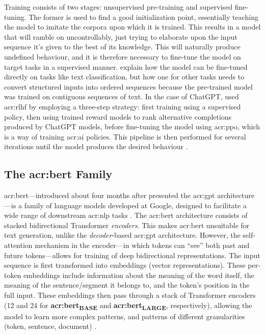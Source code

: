 Training consists of two stages: unsupervised pre-training and supervised fine-tuning. The former is used to find a good initialization point, essentially teaching the model to imitate the corpora upon which it is trained. This results in a model that will ramble on uncontrollably, just trying to elaborate upon the input sequence it's given to the best of its knowledge. This will naturally produce undefined behaviour, and it is therefore necessary to fine-tune the model on target tasks in a supervised manner. \cite[4]{radfordImprovingLanguageUnderstanding2018} explain how the model can be fine-tuned directly on tasks like text classification, but how one for other tasks needs to convert structured inputs into ordered sequences because the pre-trained model was trained on contiguous sequences of text. In the case of ChatGPT, \citeauthor{openaiIntroducingChatGPT2022} used \gls{acr:rlhf} by employing a three-step strategy: first training using a supervised policy, then using trained reward models to rank alternative completions produced by ChatGPT models, before fine-tuning the model using \gls{acr:ppo}, which is a way of training \acrshort{acr:ai} policies. This pipeline is then performed for several iterations until the model produces the desired behaviour \citep{openaiIntroducingChatGPT2022}.

\subsection[The BERT Family]{The \acrshort{acr:bert} Family}\label{subsec:bert}

\gls{acr:bert}---introduced about four months after \cite{radfordImprovingLanguageUnderstanding2018} presented the \acrshort{acr:gpt} architecture---is a family of language models developed at Google, designed to facilitate a wide range of downstream \gls{acr:nlp} tasks \citep[5]{devlinBERTPretrainingDeep2019}. The \acrshort{acr:bert} architecture consists of stacked bidirectional Transformer \textit{encoders}. This makes \acrshort{acr:bert} unsuitable for text generation, unlike the \textit{decoder}-based \acrshort{acr:gpt} architecture. However, the self-attention mechanism in the encoder---in which tokens can \enquote{see} both past and future tokens---allows for training of deep bidirectional representations. The input sequence is first transformed into embeddings (vector representations). These per-token embeddings include information about the meaning of the word itself, the meaning of the sentence/segment it belongs to, and the token's position in the full input. These embeddings then pass through a stack of Transformer encoders (12 and 24 for \textbf{\acrshort{acr:bert}\textsubscript{BASE}} and \textbf{\acrshort{acr:bert}\textsubscript{LARGE}}, respectively), allowing the model to learn more complex patterns, and patterns of different granularities (token, sentence, document) \citep[5]{devlinBERTPretrainingDeep2019}.

